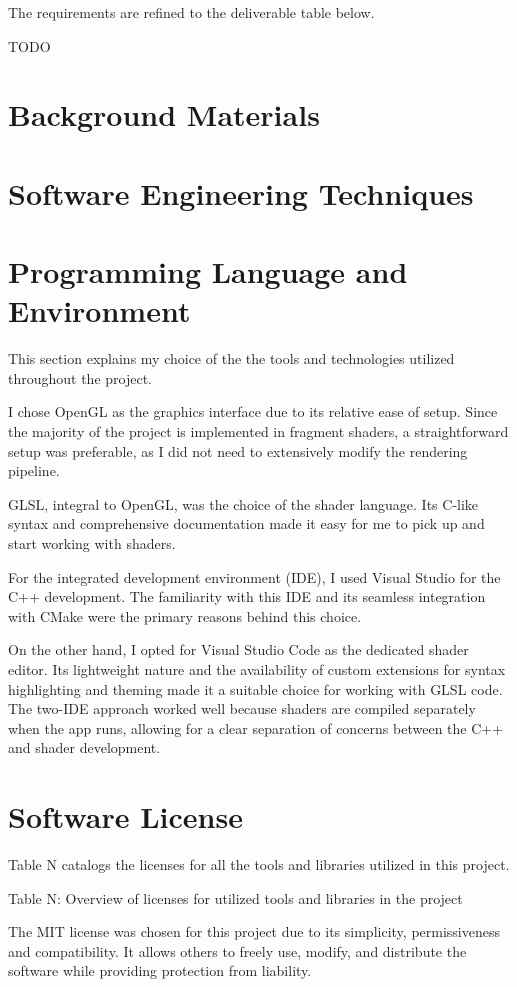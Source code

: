 The requirements are refined to the deliverable table below.

TODO

\section{Background Materials}
\label{sec:2.3}

\section{Software Engineering Techniques}
\label{sec:2.4}

\section{Programming Language and Environment}
\label{sec:2.5}

This section explains my choice of the the tools and technologies utilized throughout the project.

I chose OpenGL as the graphics interface due to its relative ease of setup. Since the majority of the project is implemented in fragment shaders, a straightforward setup was preferable, as I did not need to extensively modify the rendering pipeline.

GLSL, integral to OpenGL, was the choice of the shader language. Its C-like syntax and comprehensive documentation made it easy for me to pick up and start working with shaders.

For the integrated development environment (IDE), I used Visual Studio for the C++ development. The familiarity with this IDE and its seamless integration with CMake were the primary reasons behind this choice.

On the other hand, I opted for Visual Studio Code as the dedicated shader editor. Its lightweight nature and the availability of custom extensions for syntax highlighting and theming made it a suitable choice for working with GLSL code. The two-IDE approach worked well because shaders are compiled separately when the app runs, allowing for a clear separation of concerns between the C++ and shader development.

\section{Software License}
\label{sec:2.6}

Table N catalogs the licenses for all the tools and libraries utilized in this project.

Table N: Overview of licenses for utilized tools and libraries in the project

The MIT license was chosen for this project due to its simplicity, permissiveness and compatibility. It allows others to freely use, modify, and distribute the software while providing protection from liability.
